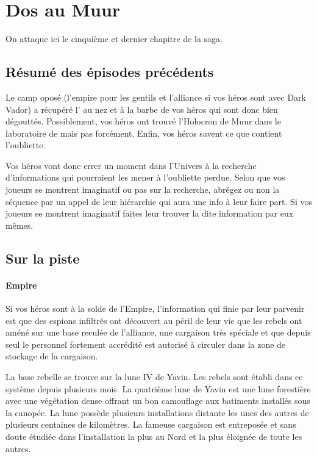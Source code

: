 \section{Dos au Muur}
On attaque ici le cinquième et dernier chapitre de la saga.

\subsection{Résumé des épisodes précédents}
Le camp oposé (l’empire pour les gentils et l’alliance si vos héros sont avec Dark Vador) a récupéré l’ au nez et à la barbe de vos héros qui sont donc bien dégouttés. Possiblement, vos héros ont trouvé l'Holocron de Muur dans le laboratoire de  mais pas forcément. Enfin, vos héros savent ce que contient l’oubliette.

Vos héros vont donc errer un moment dans l’Univers à la recherche d’informations qui pourraient les mener à l’oubliette perdue. Selon que vos joueurs se montrent imaginatif ou pas sur la recherche, abrégez ou non la séquence par un appel de leur hiérarchie qui aura une info à leur faire part. Si vos joueurs se montrent imaginatif faites leur trouver la dite information par eux mêmes.

\subsection{Sur la piste}
\paragraph{Empire}
Si vos héros sont à la solde de l’Empire, l’information qui finie par leur parvenir est que des espions infiltrés ont découvert au péril de leur vie que les rebels ont améné sur une base reculée de l’alliance, une cargaison très spéciale et que depuis seul le personnel fortement accrédité est autorisé à circuler dans la zone de stockage de la cargaison.

La base rebelle se trouve sur la lune IV de Yavin. Les rebels sont établi dans ce système depuis plusieurs mois. La quatrième lune de Yavin est une lune forestière avec une végétation dense offrant un bon camouflage aux batiments installés sous la canopée. La lune possède plusieurs installations distante les unes des autres de plusieurs centaines de kilomètres. La fameuse cargaison est entreposée et sans doute étudiée dans l’installation la plus au Nord et la plus éloignée de toute les autres.

